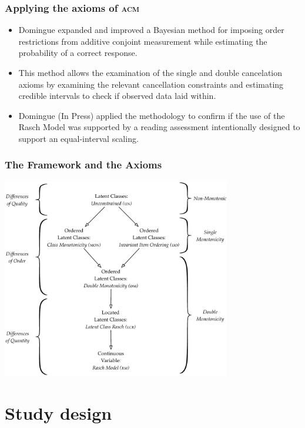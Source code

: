 \documentclass[10pt,serif,professionalfont]{beamer}
\begin{document}
\begin{frame}
    \frametitle{Applying the axioms of \textsc{acm}}

    \begin{itemize}
        \item Domingue expanded and improved a Bayesian method for imposing order restrictions from additive conjoint measurement while estimating the probability of a correct response.
        \item This method allows the examination of the single and double cancelation axioms by examining the relevant cancellation constraints and estimating credible intervals to check if observed data laid within.
        \item Domingue (In Press) applied the methodology to confirm if the use of the Rasch Model was supported by a reading assessment intentionally designed to support an equal-interval scaling.
    \end{itemize}


\end{frame}

\begin{frame}

    \frametitle{The Framework and the Axioms}

        \centering \includegraphics[width=0.75\textwidth]{./figs/Structure3.pdf} \\


\end{frame}


\section{Study design}
\end{document}
